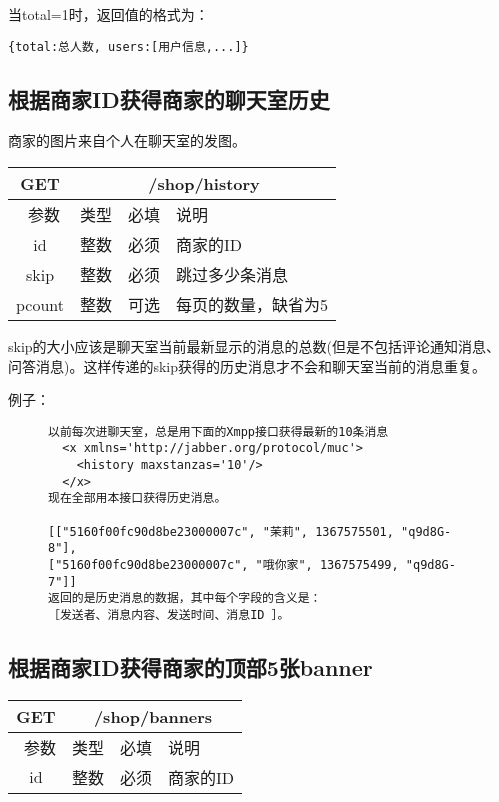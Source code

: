 \documentclass[cs4size]{ctexartutf8}
\begin{document}
当total=1时，返回值的格式为：
\begin{verbatim}
{total:总人数, users:[用户信息,...]}
\end{verbatim}


\subsection{根据商家ID获得商家的聊天室历史}
商家的图片来自个人在聊天室的发图。\label{photowall}

\begin{table}[H]
   \begin{center}
\begin{tabular}{|c|c|c|p{12cm}|}
\hline
GET & \multicolumn{3}{|c|}{/shop/history} \\
\hline\hline
 \  参数  & 类型 & 必填 &  说明  \\
\hline
 id  & 整数 & 必须 & 商家的ID\\
   \hline
 skip  & 整数 & 必须 & 跳过多少条消息\\ 
 \hline
 pcount  & 整数 & 可选 & 每页的数量，缺省为5\\ 
\hline
\end{tabular}
   \end{center}
\end{table}

skip的大小应该是聊天室当前最新显示的消息的总数(但是不包括评论通知消息、问答消息)。这样传递的skip获得的历史消息才不会和聊天室当前的消息重复。

例子：

\begin{figure}[H]
\begin{verbatim}
以前每次进聊天室，总是用下面的Xmpp接口获得最新的10条消息
  <x xmlns='http://jabber.org/protocol/muc'>
    <history maxstanzas='10'/>
  </x>
现在全部用本接口获得历史消息。
  
[["5160f00fc90d8be23000007c", "茉莉", 1367575501, "q9d8G-8"], 
["5160f00fc90d8be23000007c", "哦你家", 1367575499, "q9d8G-7"]]
返回的是历史消息的数据，其中每个字段的含义是：
［发送者、消息内容、发送时间、消息ID ］。
\end{verbatim}
\end{figure}

\subsection{根据商家ID获得商家的顶部5张banner}

\begin{table}[H]
   \begin{center}
\begin{tabular}{|c|c|c|p{12cm}|}
\hline
GET & \multicolumn{3}{|c|}{/shop/banners} \\
\hline\hline
 \  参数  & 类型 & 必填 &  说明  \\
\hline
 id  & 整数 & 必须 & 商家的ID\\
\hline
\end{tabular}
   \end{center}
\end{table}
\end{document}
